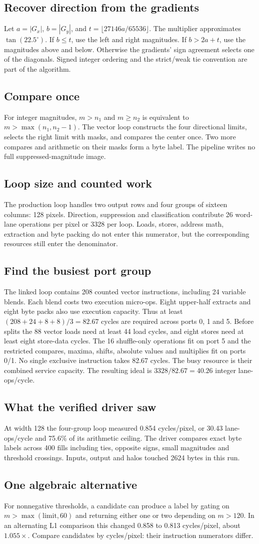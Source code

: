 \documentclass[10pt,conference,letterpaper]{IEEEtran}
\newcommand{\head}[1]{\subsection*{#1}}
\begin{document}
\head{Recover direction from the gradients}
Let $a=|G_x|$, $b=|G_y|$, and $t=\lfloor27146a/65536\rfloor$. The multiplier approximates $\tan(22.5^\circ)$. If $b\le t$, use the left and right magnitudes. If $b>2a+t$, use the magnitudes above and below. Otherwise the gradients' sign agreement selects one of the diagonals. Signed integer ordering and the strict/weak tie convention are part of the algorithm.
\head{Compare once}
For integer magnitudes, $m>n_1$ and $m\ge n_2$ is equivalent to $m>\max(n_1,n_2-1)$. The vector loop constructs the four directional limits, selects the right limit with masks, and compares the center once. Two more compares and arithmetic on their masks form a byte label. The pipeline writes no full suppressed-magnitude image.
\head{Loop size and counted work}
The production loop handles two output rows and four groups of sixteen columns: 128 pixels. Direction, suppression and classification contribute 26 word-lane operations per pixel or 3328 per loop. Loads, stores, address math, extraction and byte packing do not enter this numerator, but the corresponding resources still enter the denominator.
\newpage
\head{Find the busiest port group}
The linked loop contains 208 counted vector instructions, including 24 variable blends. Each blend costs two execution micro-ops. Eight upper-half extracts and eight byte packs also use execution capacity. Thus at least $(208+24+8+8)/3=82.67$ cycles are required across ports 0, 1 and 5. Before splits the 88 vector loads need at least 44 load cycles, and eight stores need at least eight store-data cycles. The 16 shuffle-only operations fit on port 5 and the restricted compares, maxima, shifts, absolute values and multiplies fit on ports 0/1. No single exclusive instruction takes 82.67 cycles. The busy resource is their combined service capacity. The resulting ideal is $3328/82.67=40.26$ integer lane-ops/cycle.
\head{What the verified driver saw}
At width 128 the four-group loop measured 0.854 cycles/pixel, or 30.43 lane-ops/cycle and 75.6\% of its arithmetic ceiling. The driver compares exact byte labels across 400 fills including ties, opposite signs, small magnitudes and threshold crossings. Inputs, output and halos touched 2624 bytes in this run.
\head{One algebraic alternative}
For nonnegative thresholds, a candidate can produce a label by gating on $m>\max(\mathrm{limit},60)$ and returning either one or two depending on $m>120$. In an alternating L1 comparison this changed 0.858 to 0.813 cycles/pixel, about $1.055\times$. Compare candidates by cycles/pixel: their instruction numerators differ.
\end{document}
